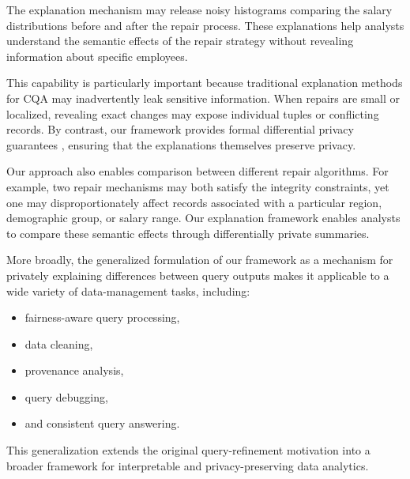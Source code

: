 The explanation mechanism may release noisy histograms comparing
the salary distributions before and after the repair process.
These explanations help analysts understand the semantic effects
of the repair strategy without revealing information about specific employees.

This capability is particularly important because traditional explanation methods
for CQA may inadvertently leak sensitive information.
When repairs are small or localized,
revealing exact changes may expose individual tuples or conflicting records.
By contrast, our framework provides formal differential privacy guarantees
\cite{dwork2014}, ensuring that the explanations themselves
preserve privacy.

Our approach also enables comparison between different repair algorithms.
For example, two repair mechanisms may both satisfy the integrity constraints,
yet one may disproportionately affect records associated with a particular region,
demographic group, or salary range.
Our explanation framework enables analysts to compare these semantic effects
through differentially private summaries.

More broadly, the generalized formulation of our framework
as a mechanism for privately explaining differences between query outputs
makes it applicable to a wide variety of data-management tasks,
including:
\begin{itemize}
    \item fairness-aware query processing,
    \item data cleaning,
    \item provenance analysis,
    \item query debugging,
    \item and consistent query answering.
\end{itemize}

This generalization extends the original query-refinement motivation
into a broader framework for interpretable and privacy-preserving
data analytics.
